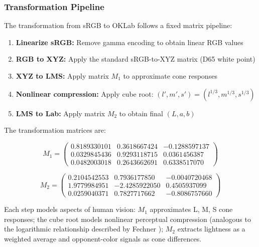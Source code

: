 \subsubsection{Transformation Pipeline}

The transformation from sRGB to OKLab follows a fixed matrix pipeline:

\begin{enumerate}
    \item \textbf{Linearize sRGB:} Remove gamma encoding to obtain linear RGB values
    \item \textbf{RGB to XYZ:} Apply the standard sRGB-to-XYZ matrix (D65 white point)
    \item \textbf{XYZ to LMS:} Apply matrix $M_1$ to approximate cone responses
    \item \textbf{Nonlinear compression:} Apply cube root: $(l', m', s') = (l^{1/3}, m^{1/3}, s^{1/3})$
    \item \textbf{LMS to Lab:} Apply matrix $M_2$ to obtain final $(L, a, b)$
\end{enumerate}

The transformation matrices are:

\begin{equation}
    M_1 = \begin{pmatrix}
    0.8189330101 & 0.3618667424 & -0.1288597137 \\
    0.0329845436 & 0.9293118715 & 0.0361456387 \\
    0.0482003018 & 0.2643662691 & 0.6338517070
    \end{pmatrix}
    \label{eq:oklab-m1}
\end{equation}

\begin{equation}
    M_2 = \begin{pmatrix}
    0.2104542553 & 0.7936177850 & -0.0040720468 \\
    1.9779984951 & -2.4285922050 & 0.4505937099 \\
    0.0259040371 & 0.7827717662 & -0.8086757660
    \end{pmatrix}
    \label{eq:oklab-m2}
\end{equation}

Each step models aspects of human vision: $M_1$ approximates L, M, S cone responses; the cube root models nonlinear perceptual compression (analogous to the logarithmic relationship described by Fechner \citeyearpar{fechner1860}); $M_2$ extracts lightness as a weighted average and opponent-color signals as cone differences.

